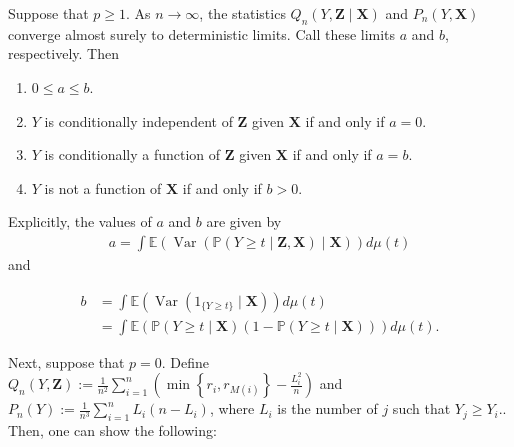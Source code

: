 \begin{theorem}\citep{azadkia2021simple}
\label{thm:91_mona}
    Suppose that $p \geq 1$. As $n \rightarrow \infty$, the statistics $Q_n(Y, \mathbf{Z} \mid \mathbf{X})$ and $P_n(Y, \mathbf{X})$ converge almost surely to deterministic limits. Call these limits $a$ and $b$, respectively. Then
    \begin{enumerate}
        \item $0 \leq a \leq b$.
        \item $Y$ is conditionally independent of $\mathbf{Z}$ given $\mathbf{X}$ if and only if $a=0$.
        \item $Y$ is conditionally a function of $\mathbf{Z}$ given $\mathbf{X}$ if and only if $a=b$.
        \item $Y$ is not a function of $\mathbf{X}$ if and only if $b>0$.
    \end{enumerate}

Explicitly, the values of $a$ and $b$ are given by
\begin{align*}
    a=\int \mathbb{E}(\operatorname{Var}(\mathbb{P}(Y \geq t \mid \mathbf{Z}, \mathbf{X}) \mid \mathbf{X})) d \mu(t)    
\end{align*}
and 


\begin{align*}
b & =\int \mathbb{E}\left(\operatorname{Var}\left(1_{\{Y \geq t\}} \mid \mathbf{X}\right)\right) d \mu(t) \\
& =\int \mathbb{E}(\mathbb{P}(Y \geq t \mid \mathbf{X})(1-\mathbb{P}(Y \geq t \mid \mathbf{X}))) d \mu(t) .
\end{align*}
\end{theorem}


Next, suppose that $p=0$. Define $Q_n(Y, \mathbf{Z}):=\frac{1}{n^2} \sum_{i=1}^n\left(\min \left\{r_i, r_{M(i)}\right\}-\frac{L_i^2}{n}\right)$ and $P_n(Y):=\frac{1}{n^3} \sum_{i=1}^n L_i\left(n-L_i\right)$, where $L_i$ is the number of $j$ such that $Y_j \geq Y_i$.. Then, one can show the following:


